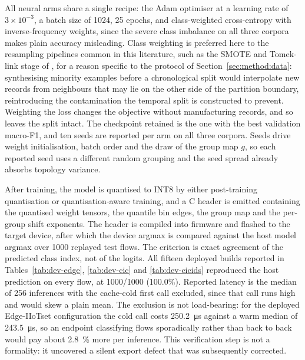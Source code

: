 \documentclass[10pt,letterpaper,twocolumn]{article}
\begin{document}
All neural arms share a single recipe: the Adam optimiser at a learning rate of
$3 \times 10^{-3}$, a batch size of 1024, 25 epochs, and class-weighted
cross-entropy with inverse-frequency weights, since the severe class imbalance
on all three corpora makes plain accuracy misleading. Class weighting is preferred
here to the resampling pipelines common in this literature, such as the SMOTE
and Tomek-link stage of \cite{villafranca2025edgedl}, for a reason specific to
the protocol of Section~\ref{sec:method:data}: synthesising minority examples
before a chronological split would interpolate new records from neighbours that
may lie on the other side of the partition boundary, reintroducing the
contamination the temporal split is constructed to prevent. Weighting the loss
changes the objective without manufacturing records, and so leaves the split
intact. The checkpoint retained is the
one with the best validation macro-F1, and ten seeds are reported per arm on
all three corpora. Seeds drive weight initialisation, batch order and the draw of
the group map $g$, so each reported seed uses a different random grouping and
the seed spread already absorbs topology variance.

After training, the model is quantised to INT8 by either post-training
quantisation or quantisation-aware training, and a C header is emitted
containing the quantised weight tensors, the quantile bin edges, the group map
and the per-group shift exponents. The header is compiled into firmware and
flashed to the target device, after which the device argmax is compared against
the host model argmax over 1000 replayed test flows. The criterion is exact
agreement of the predicted class index, not of the logits. All fifteen deployed
builds reported in Tables~\ref{tab:dev-edge}, \ref{tab:dev-cic} and
\ref{tab:dev-cicids} reproduced
the host prediction on every flow, at 1000/1000 (100.0\%). Reported latency is
the median of 256 inferences with the cache-cold first call excluded, since
that call runs high and would skew a plain mean. The exclusion is not
load-bearing: for the deployed Edge-IIoTset configuration the cold call costs
\SI{250.2}{\micro\second} against a warm median of \SI{243.5}{\micro\second}, so
an endpoint classifying flows sporadically rather than back to back would pay
about \SI{2.8}{\percent} more per inference. This verification
step is not a formality: it uncovered a silent export defect that was
subsequently corrected.
\end{document}
